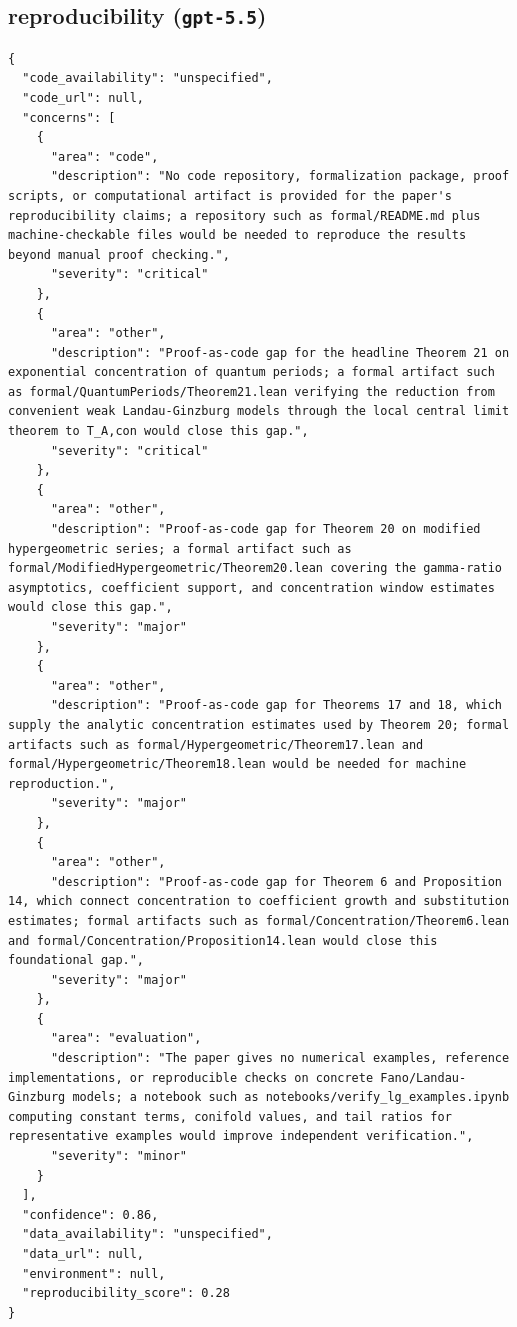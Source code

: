 \documentclass[11pt]{article}
\begin{document}
\subsection*{reproducibility (\texttt{gpt-5.5})}
\begin{verbatim}
{
  "code_availability": "unspecified",
  "code_url": null,
  "concerns": [
    {
      "area": "code",
      "description": "No code repository, formalization package, proof scripts, or computational artifact is provided for the paper's reproducibility claims; a repository such as formal/README.md plus machine-checkable files would be needed to reproduce the results beyond manual proof checking.",
      "severity": "critical"
    },
    {
      "area": "other",
      "description": "Proof-as-code gap for the headline Theorem 21 on exponential concentration of quantum periods; a formal artifact such as formal/QuantumPeriods/Theorem21.lean verifying the reduction from convenient weak Landau-Ginzburg models through the local central limit theorem to T_A,con would close this gap.",
      "severity": "critical"
    },
    {
      "area": "other",
      "description": "Proof-as-code gap for Theorem 20 on modified hypergeometric series; a formal artifact such as formal/ModifiedHypergeometric/Theorem20.lean covering the gamma-ratio asymptotics, coefficient support, and concentration window estimates would close this gap.",
      "severity": "major"
    },
    {
      "area": "other",
      "description": "Proof-as-code gap for Theorems 17 and 18, which supply the analytic concentration estimates used by Theorem 20; formal artifacts such as formal/Hypergeometric/Theorem17.lean and formal/Hypergeometric/Theorem18.lean would be needed for machine reproduction.",
      "severity": "major"
    },
    {
      "area": "other",
      "description": "Proof-as-code gap for Theorem 6 and Proposition 14, which connect concentration to coefficient growth and substitution estimates; formal artifacts such as formal/Concentration/Theorem6.lean and formal/Concentration/Proposition14.lean would close this foundational gap.",
      "severity": "major"
    },
    {
      "area": "evaluation",
      "description": "The paper gives no numerical examples, reference implementations, or reproducible checks on concrete Fano/Landau-Ginzburg models; a notebook such as notebooks/verify_lg_examples.ipynb computing constant terms, conifold values, and tail ratios for representative examples would improve independent verification.",
      "severity": "minor"
    }
  ],
  "confidence": 0.86,
  "data_availability": "unspecified",
  "data_url": null,
  "environment": null,
  "reproducibility_score": 0.28
}
\end{verbatim}
\end{document}
